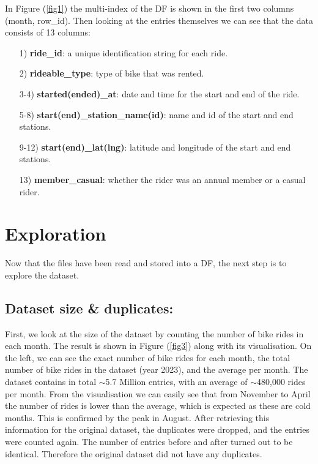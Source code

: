 \documentclass[12pt]{article}
\begin{document}
	In Figure (\underline{\ref{fig1}}) the multi-index of the DF is shown in the first two columns (month, row\_id). Then looking at the entries themselves we can see that the data consists of 13 columns: 
	\begin{itemize}
	\item [1)] \textbf{ride\_id}: a unique identification string for each ride.
	\item [2)] \textbf{rideable\_type}: type of bike that was rented.
	\item [3-4)] \textbf{started(ended)\_at}: date and time for the start and end of the ride.
	\item [5-8)]  \textbf{start(end)\_station\_name(id)}: name and id of the start and end stations.
	\item [9-12)] \textbf{start(end)\_lat(lng)}: latitude and longitude of the start and end stations.
	\item [13)] \textbf{member\_casual}: whether the rider was an annual member or a casual rider.
	\end{itemize}

\section{Exploration}
Now that the files have been read and stored into a DF, the next step is to explore the dataset.
 
\subsection{Dataset size \& duplicates:}
First, we look at the size of the dataset by counting the number of bike rides in each month. The result is shown in Figure (\underline{\ref{fig3}}) along with its visualisation. On the left, we can see the exact number of bike rides for each month, the total number of bike rides in the dataset (year 2023), and the average per month. The dataset contains in total $\sim$5.7 Million entries, with an average of $\sim$480,000 rides per month. From the visualisation we can easily see that from November to April the number of rides is lower than the average, which is expected as these are cold months. This is confirmed by the peak in August. After retrieving this information for the original dataset, the duplicates were dropped, and the entries were counted again. The number of entries before and after turned out to be identical. Therefore the original dataset did not have any duplicates.\\ 
	
\end{document}
